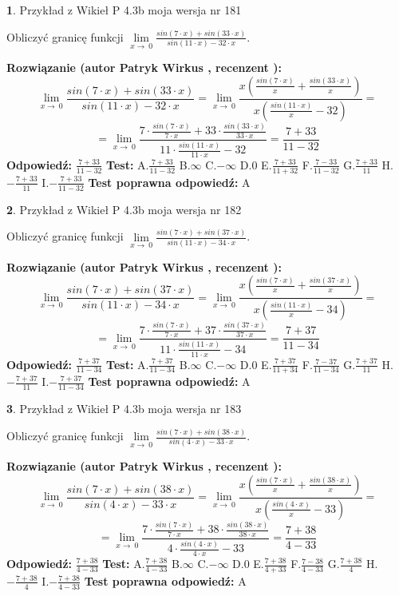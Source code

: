 \documentclass[12pt, a4paper]{article}
\theoremstyle{definition} %
\newtheorem{zad}{}
\newcommand{\zadStart}[1]{\begin{zad}#1\newline}
\newcommand{\zadStop}{\end{zad}}
\newcommand{\rozwStart}[2]{\noindent \textbf{Rozwiązanie (autor #1 , recenzent #2): }\newline}
\newcommand{\rozwStop}{\newline}
\newcommand{\odpStart}{\noindent \textbf{Odpowiedź:}\newline}
\newcommand{\odpStop}{\newline}
\newcommand{\testStart}{\noindent \textbf{Test:}\newline}
\newcommand{\testStop}{\newline}
\newcommand{\kluczStart}{\noindent \textbf{Test poprawna odpowiedź:}\newline}
\newcommand{\kluczStop}{\newline}
\begin{document}
\zadStart{Przykład z Wikieł P 4.3b moja wersja nr 181}


Obliczyć granicę funkcji $\lim\limits_{x\to\ 0}\frac{sin(7 \cdot x)+sin(33 \cdot x)}{sin(11 \cdot x)-32 \cdot x}$.
\zadStop
\rozwStart{Patryk Wirkus}{}
$$\lim\limits_{x\to\ 0}\frac{sin(7 \cdot x)+sin(33 \cdot x)}{sin(11 \cdot x)-32 \cdot x}=\lim\limits_{x\to\ 0}\frac{x(\frac{sin(7 \cdot x)}{x}+\frac{sin(33 \cdot x)}{x})}{x(\frac{sin(11 \cdot x)}{x}-32)}=$$
$$=\lim\limits_{x\to\ 0}\frac{7 \cdot \frac{sin(7 \cdot x)}{7 \cdot x}+33 \cdot \frac{sin(33 \cdot x)}{33 \cdot x}}{11 \cdot \frac{sin(11 \cdot x)}{11 \cdot x}-32}=\frac{7+33}{11-32}$$
\rozwStop
\odpStart
$\frac{7+33}{11-32}$
\odpStop
\testStart
A.$\frac{7+33}{11-32}$
B.$\infty$
C.$-\infty$
D.$0$
E.$\frac{7+33}{11+32}$
F.$\frac{7-33}{11-32}$
G.$\frac{7+33}{11}$
H.$-\frac{7+33}{11}$
I.$-\frac{7+33}{11-32}$
\testStop
\kluczStart
A
\kluczStop



\zadStart{Przykład z Wikieł P 4.3b moja wersja nr 182}


Obliczyć granicę funkcji $\lim\limits_{x\to\ 0}\frac{sin(7 \cdot x)+sin(37 \cdot x)}{sin(11 \cdot x)-34 \cdot x}$.
\zadStop
\rozwStart{Patryk Wirkus}{}
$$\lim\limits_{x\to\ 0}\frac{sin(7 \cdot x)+sin(37 \cdot x)}{sin(11 \cdot x)-34 \cdot x}=\lim\limits_{x\to\ 0}\frac{x(\frac{sin(7 \cdot x)}{x}+\frac{sin(37 \cdot x)}{x})}{x(\frac{sin(11 \cdot x)}{x}-34)}=$$
$$=\lim\limits_{x\to\ 0}\frac{7 \cdot \frac{sin(7 \cdot x)}{7 \cdot x}+37 \cdot \frac{sin(37 \cdot x)}{37 \cdot x}}{11 \cdot \frac{sin(11 \cdot x)}{11 \cdot x}-34}=\frac{7+37}{11-34}$$
\rozwStop
\odpStart
$\frac{7+37}{11-34}$
\odpStop
\testStart
A.$\frac{7+37}{11-34}$
B.$\infty$
C.$-\infty$
D.$0$
E.$\frac{7+37}{11+34}$
F.$\frac{7-37}{11-34}$
G.$\frac{7+37}{11}$
H.$-\frac{7+37}{11}$
I.$-\frac{7+37}{11-34}$
\testStop
\kluczStart
A
\kluczStop



\zadStart{Przykład z Wikieł P 4.3b moja wersja nr 183}


Obliczyć granicę funkcji $\lim\limits_{x\to\ 0}\frac{sin(7 \cdot x)+sin(38 \cdot x)}{sin(4 \cdot x)-33 \cdot x}$.
\zadStop
\rozwStart{Patryk Wirkus}{}
$$\lim\limits_{x\to\ 0}\frac{sin(7 \cdot x)+sin(38 \cdot x)}{sin(4 \cdot x)-33 \cdot x}=\lim\limits_{x\to\ 0}\frac{x(\frac{sin(7 \cdot x)}{x}+\frac{sin(38 \cdot x)}{x})}{x(\frac{sin(4 \cdot x)}{x}-33)}=$$
$$=\lim\limits_{x\to\ 0}\frac{7 \cdot \frac{sin(7 \cdot x)}{7 \cdot x}+38 \cdot \frac{sin(38 \cdot x)}{38 \cdot x}}{4 \cdot \frac{sin(4 \cdot x)}{4 \cdot x}-33}=\frac{7+38}{4-33}$$
\rozwStop
\odpStart
$\frac{7+38}{4-33}$
\odpStop
\testStart
A.$\frac{7+38}{4-33}$
B.$\infty$
C.$-\infty$
D.$0$
E.$\frac{7+38}{4+33}$
F.$\frac{7-38}{4-33}$
G.$\frac{7+38}{4}$
H.$-\frac{7+38}{4}$
I.$-\frac{7+38}{4-33}$
\testStop
\kluczStart
A
\kluczStop
\end{document}
